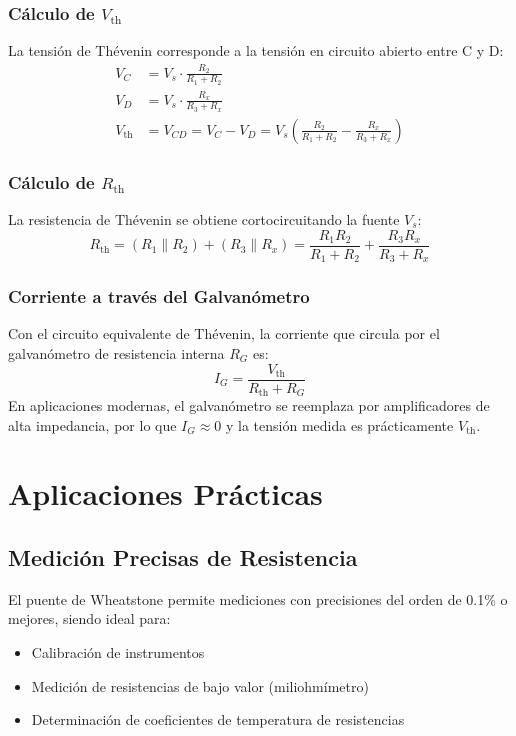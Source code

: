\documentclass{article}
\begin{document}
\subsubsection{Cálculo de $V_{\mathrm{th}}$}
La tensión de Thévenin corresponde a la tensión en circuito abierto entre C y D:
\begin{align}
V_C &= V_s \cdot \frac{R_2}{R_1 + R_2} \\
V_D &= V_s \cdot \frac{R_x}{R_3 + R_x} \\
V_{\mathrm{th}} &= V_{CD} = V_C - V_D = V_s \left( \frac{R_2}{R_1 + R_2} - \frac{R_x}{R_3 + R_x} \right)
\end{align}

\subsubsection{Cálculo de $R_{\mathrm{th}}$}
La resistencia de Thévenin se obtiene cortocircuitando la fuente $V_s$:
\begin{equation}
R_{\mathrm{th}} = (R_1 \parallel R_2) + (R_3 \parallel R_x) = \frac{R_1 R_2}{R_1 + R_2} + \frac{R_3 R_x}{R_3 + R_x}
\end{equation}

\subsubsection{Corriente a través del Galvanómetro}
Con el circuito equivalente de Thévenin, la corriente que circula por el galvanómetro de resistencia interna $R_G$ es:
\begin{equation}
I_G = \frac{V_{\mathrm{th}}}{R_{\mathrm{th}} + R_G}
\end{equation}
En aplicaciones modernas, el galvanómetro se reemplaza por amplificadores de alta impedancia, por lo que $I_G \approx 0$ y la tensión medida es prácticamente $V_{\mathrm{th}}$.

\section{Aplicaciones Prácticas}

\subsection{Medición Precisas de Resistencia}
El puente de Wheatstone permite mediciones con precisiones del orden de 0.1\% o mejores, siendo ideal para:
\begin{itemize}
    \item Calibración de instrumentos
    \item Medición de resistencias de bajo valor (miliohmímetro)
    \item Determinación de coeficientes de temperatura de resistencias
\end{itemize}
\end{document}
